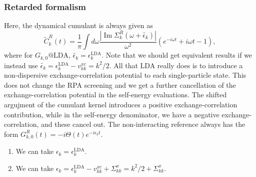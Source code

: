 \subsubsection{Retarded formalism}
Here, the dynamical cumulant is always given as 
\begin{equation}
    \tilde{C}_k^R(t) = \frac{1}{\pi}\int d\omega \frac{|\operatorname{Im} \Sigma_k^R(\omega+\tilde{\epsilon_k})|}{\omega^2} \left( e^{-i\omega t} + i\omega t - 1 \right),
\end{equation}
where for $G_{k,0}@\mathrm{LDA}$, $\tilde{\epsilon_k} = \epsilon_k^{\mathrm{LDA}}$. Note that we should get equivalent results if we instead use $\tilde{\epsilon_k} = \epsilon_k^{\mathrm{LDA}} - v_{kk}^{xc} = k^2/2$. All that LDA really does is to introduce a non-dispersive exchange-correlation potential to each single-particle state. This does not change the RPA screening and we get a further cancellation of the exchange-correlation potential in the self-energy evaluations. The shifted argujment of the cumulant kernel introduces a positive exchange-correlation contribution, while in the self-energy denominator, we have a negative exchange-correlation, and these cancel out. The non-interacting reference always has the form $G_{k,0}^R(t) = -i \Theta(t) e^{-i\epsilon_k t}$.
\begin{enumerate}
    \item We can take $\epsilon_k = \epsilon_k^{\mathrm{LDA}}$.
    \item We can take $\epsilon_k = \epsilon_k^{\mathrm{LDA}} - v_{kk}^{xc} + \Sigma_{kk}^x = k^2/2 + \Sigma_{kk}^x$.
\end{enumerate}
